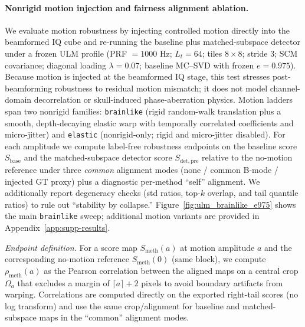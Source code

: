\documentclass[11pt]{article}
\newif\ifSTAPPAPERONLY
\newcommand{\SuppOrApp}[1]{\ifSTAPPAPERONLY Supplementary Material\else Appendix~\ref{#1}\fi}
\begin{document}
\paragraph{Nonrigid motion injection and fairness alignment ablation.}
We evaluate motion robustness by injecting controlled motion directly into the beamformed IQ cube and re-running the baseline plus matched-subspace detector under a frozen ULM profile (PRF $=1000$ Hz; $L_t=64$; tiles $8\times 8$; stride 3; SCM covariance; diagonal loading $\lambda=0.07$; baseline MC--SVD with frozen $e=0.975$). Because motion is injected at the beamformed IQ stage, this test stresses post-beamforming robustness to residual motion mismatch; it does not model channel-domain decorrelation or skull-induced phase-aberration physics. Motion ladders span two nonrigid families: \texttt{brainlike} (rigid random-walk translation plus a smooth, depth-decaying elastic warp with temporally correlated coefficients and micro-jitter) and \texttt{elastic} (nonrigid-only; rigid and micro-jitter disabled). For each amplitude we compute label-free robustness endpoints on the baseline score $S_{\mathrm{base}}$ and the matched-subspace detector score $S_{\mathrm{det,pre}}$ relative to the no-motion reference under three \emph{common} alignment modes (none / common B-mode / injected GT proxy) plus a diagnostic per-method ``self'' alignment. We additionally report degeneracy checks (std ratios, top-$k$ overlap, and tail quantile ratios) to rule out ``stability by collapse.'' Figure~\ref{fig:ulm_brainlike_e975} shows the main \texttt{brainlike} sweep; additional motion variants are provided in \SuppOrApp{app:supp-results}.

\emph{Endpoint definition.} For a score map $S_{\mathrm{meth}}(a)$ at motion amplitude $a$ and the corresponding no-motion reference $S_{\mathrm{meth}}(0)$ (same block), we compute $\rho_{\mathrm{meth}}(a)$ as the Pearson correlation between the aligned maps on a central crop $\Omega_a$ that excludes a margin of $\lceil a\rceil+2$ pixels to avoid boundary artifacts from warping. Correlations are computed directly on the exported right-tail scores (no log transform) and use the same crop/alignment for baseline and matched-subspace maps in the ``common'' alignment modes.
\end{document}
